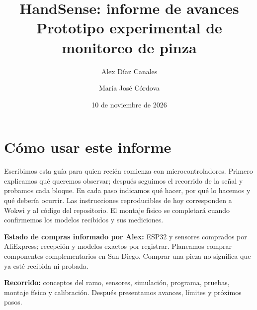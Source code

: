 \documentclass[11pt,a4paper]{article}
\title{HandSense: informe de avances\\Prototipo experimental de monitoreo de pinza}
\author{Alex Díaz Canales \and María José Córdova}
\date{10 de noviembre de 2026}
\begin{document}
\maketitle

\section*{Cómo usar este informe}
Escribimos esta guía para quien recién comienza con microcontroladores. Primero explicamos qué queremos observar; después seguimos el recorrido de la señal y probamos cada bloque. En cada paso indicamos qué hacer, por qué lo hacemos y qué debería ocurrir. Las instrucciones reproducibles de hoy corresponden a Wokwi y al código del repositorio. El montaje físico se completará cuando confirmemos los modelos recibidos y sus mediciones.

\textbf{Estado de compras informado por Alex:} ESP32 y sensores comprados por AliExpress; recepción y modelos exactos por registrar. Planeamos comprar componentes complementarios en San Diego. Comprar una pieza no significa que ya esté recibida ni probada.

\noindent\textbf{Recorrido:} conceptos del ramo, sensores, simulación, programa, pruebas, montaje físico y calibración. Después presentamos avances, límites y próximos pasos.
\newpage
\end{document}
